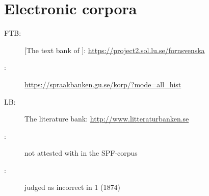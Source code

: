 \documentclass[output=paper]{langscibook}
\begin{document}
\section*{Electronic corpora}

\begin{description}
\item[FTB:]  [The text bank of ]: \url{https://project2.sol.lu.se/fornsvenska} 
\item[:] \url{https://spraakbanken.gu.se/korp/?mode=all_hist}
\item[LB:] The  literature bank: \url{http://www.litteraturbanken.se}
\end{description}



\label{falk:appendix:1}

\begin{description}
\item[\normalfont *:] not attested with  in the SPF-corpus
\item[\normalfont {}:]  judged as incorrect in  1 (1874)
\end{description}
\end{document}
